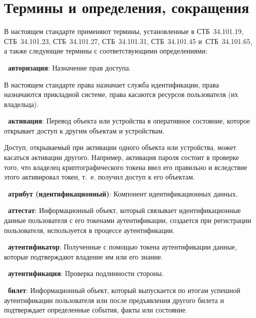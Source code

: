 \chapter{Термины и определения, сокращения}\label{TERMS}

В настоящем стандарте применяют термины, установленные в СТБ~34.101.19, 
СТБ~34.101.23, СТБ~34.101.27, СТБ~34.101.31, СТБ~34.101.45 и~СТБ~34.101.65, 
а также следующие термины с соответствующими определениями:

{\bf \thedefctr~авторизация}:
Назначение прав доступа.

\begin{note*}
В настоящем стандарте права назначает служба идентификации,
права назначаются прикладной системе, права касаются ресурсов пользователя
(их владельца).
\end{note*}

{\bf \thedefctr~активация}:
Перевод объекта или устройства в оперативное состояние,
которое открывает доступ к другим объектам и устройствам. 

\begin{note*}
Доступ, открываемый при активации одного объекта или устройства,
может касаться активации другого.
%
Например, активация пароля состоит в проверке того, что 
владелец криптографического токена ввел его правильно 
и вследствие этого активировал токен, т.~е. получил доступ к его объектам.  
\end{note*}

{\bf \thedefctr~атрибут (идентификационный)}:
Компонент идентификационных данных.

{\bf \thedefctr~аттестат}:
Информационный объект, который связывает идентификационные 
данные пользователя с его токенами аутентификации,
создается при регистрации пользователя,
используется в процессе аутентификации.

{\bf \thedefctr~аутентификатор}:
Полученные с помощью токена аутентификации данные, 
которые подтверждают владение им или его знание. 

{\bf \thedefctr~аутентификация}:
Проверка подлинности стороны.


{\bf \thedefctr~билет}:
Информационный объект, который выпускается по итогам успешной аутентификации
пользователя или после предъявления другого билета и подтверждает определенные  
события, факты или состояние. 


